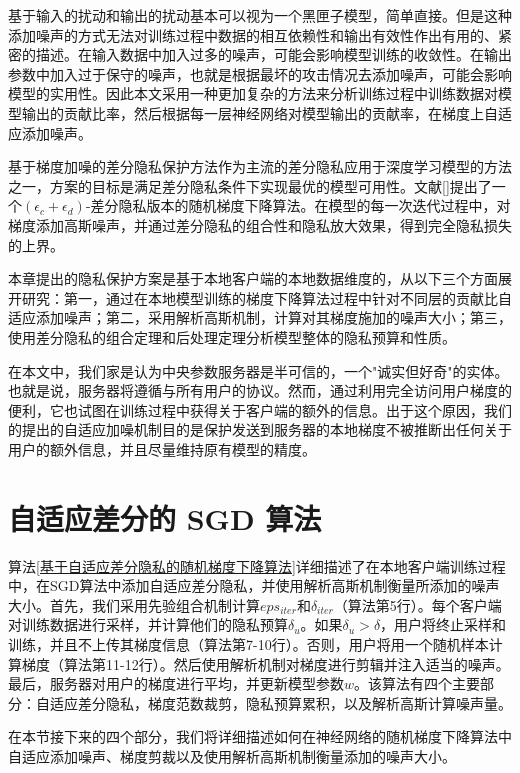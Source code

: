 基于输入的扰动和输出的扰动基本可以视为一个黑匣子模型，简单直接。但是这种添加噪声的方式无法对训练过程中数据的相互依赖性和输出有效性作出有用的、紧密的描述。在输入数据中加入过多的噪声，可能会影响模型训练的收敛性。在输出参数中加入过于保守的噪声，也就是根据最坏的攻击情况去添加噪声，可能会影响模型的实用性。因此本文采用一种更加复杂的方法来分析训练过程中训练数据对模型输出的贡献比率，然后根据每一层神经网络对模型输出的贡献率，在梯度上自适应添加噪声。

基于梯度加噪的差分隐私保护方法作为主流的差分隐私应用于深度学习模型的方法之一，方案的目标是满足差分隐私条件下实现最优的模型可用性。文献[]提出了一个$\left(\epsilon_{c}+\epsilon_{d}\right)$-差分隐私版本的随机梯度下降算法。在模型的每一次迭代过程中，对梯度添加高斯噪声，并通过差分隐私的组合性和隐私放大效果，得到完全隐私损失的上界。

本章提出的隐私保护方案是基于本地客户端的本地数据维度的，从以下三个方面展开研究：第一，通过在本地模型训练的梯度下降算法过程中针对不同层的贡献比自适应添加噪声；第二，采用解析高斯机制，计算对其梯度施加的噪声大小；第三，使用差分隐私的组合定理和后处理定理分析模型整体的隐私预算和性质。

在本文中，我们家是认为中央参数服务器是半可信的，一个"诚实但好奇"的实体。也就是说，服务器将遵循与所有用户的协议。然而，通过利用完全访问用户梯度的便利，它也试图在训练过程中获得关于客户端的额外的信息。出于这个原因，我们的提出的自适应加噪机制目的是保护发送到服务器的本地梯度不被推断出任何关于用户的额外信息，并且尽量维持原有模型的精度。

\section{自适应差分的 SGD 算法}

算法\ref{基于自适应差分隐私的随机梯度下降算法}详细描述了在本地客户端训练过程中，在SGD算法中添加自适应差分隐私，并使用解析高斯机制衡量所添加的噪声大小。首先，我们采用先验组合机制计算$eps_{iter}$和$\delta_{iter}$（算法第5行）。每个客户端对训练数据进行采样，并计算他们的隐私预算$\delta_{u}$。如果$\delta_{u}>\delta$，用户将终止采样和训练，并且不上传其梯度信息（算法第7-10行）。否则，用户将用一个随机样本计算梯度（算法第11-12行）。然后使用解析机制对梯度进行剪辑并注入适当的噪声。最后，服务器对用户的梯度进行平均，并更新模型参数$w$。该算法有四个主要部分：自适应差分隐私，梯度范数裁剪，隐私预算累积，以及解析高斯计算噪声量。

在本节接下来的四个部分，我们将详细描述如何在神经网络的随机梯度下降算法中自适应添加噪声、梯度剪裁以及使用解析高斯机制衡量添加的噪声大小。

